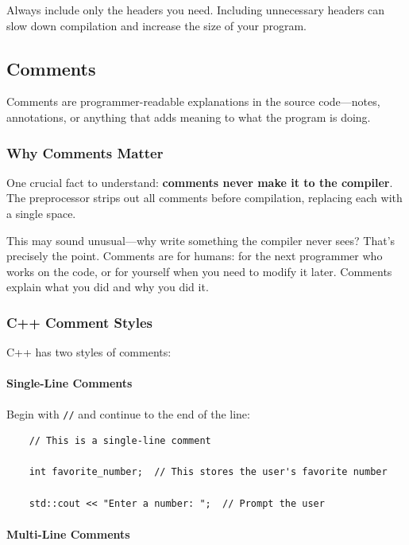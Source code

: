 \begin{remark}
	Always include only the headers you need. Including unnecessary headers can slow down compilation and increase the size of your program.
\end{remark}

\subsection{Comments}

Comments are programmer-readable explanations in the source code—notes, annotations, or anything that adds meaning to what the program is doing.

\subsubsection{Why Comments Matter}

One crucial fact to understand: \textbf{comments never make it to the compiler}. The preprocessor strips out all comments before compilation, replacing each with a single space.

This may sound unusual—why write something the compiler never sees? That's precisely the point. Comments are for humans: for the next programmer who works on the code, or for yourself when you need to modify it later. Comments explain what you did and why you did it.

\subsubsection{C++ Comment Styles}

C++ has two styles of comments:

\paragraph{Single-Line Comments}

Begin with \texttt{//} and continue to the end of the line:

\begin{lstlisting}
	// This is a single-line comment
	
	int favorite_number;  // This stores the user's favorite number
	
	std::cout << "Enter a number: ";  // Prompt the user
\end{lstlisting}

\paragraph{Multi-Line Comments}

